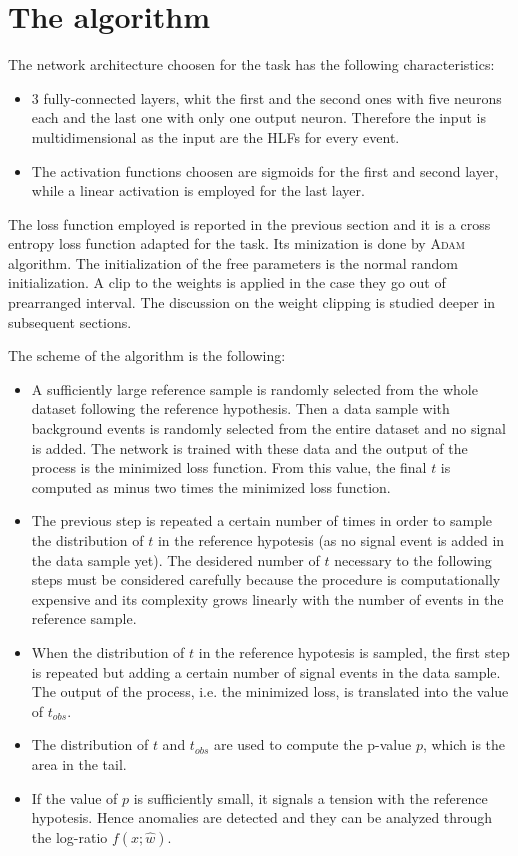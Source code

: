 \section{The algorithm}
The network architecture choosen for the task has the following characteristics:
\begin{itemize}
	\item 3 fully-connected layers, whit the first and the second ones with five neurons each and the last one with only one output neuron. Therefore the input is multidimensional as the input are the HLFs for every event.
	\item The activation functions choosen are sigmoids for the first and second layer, while a linear activation is employed for the last layer.
\end{itemize}

The loss function employed is reported in the previous section and it is a cross entropy loss function adapted for the task. Its minization is done by \textsc{Adam} algorithm. The initialization of the free parameters is the normal random initialization. A clip to the weights is applied in the case they go out of prearranged interval. The discussion on the weight clipping is studied deeper in subsequent sections.

The scheme of the algorithm is the following:
\begin{itemize}
	\item A sufficiently large reference sample is randomly selected from the whole dataset following the reference hypothesis. Then a data sample with background events is randomly selected from the entire dataset and no signal is added. The network is trained with these data and the output of the process is the minimized loss function. From this value, the final $t$ is computed as minus two times the minimized loss function.
	\item The previous step is repeated a certain number of times in order to sample the distribution of $t$ in the reference hypotesis (as no signal event is added in the data sample yet). The desidered number of $t$ necessary to the following steps must be considered carefully because the procedure is computationally expensive and its complexity grows linearly with the number of events in the reference sample.
	\item When the distribution of $t$ in the reference hypotesis is sampled, the first step is repeated but adding a certain number of signal events in the data sample. The output of the process, i.e. the minimized loss, is translated into the value of $t_{obs}$.
	\item The distribution of $t$ and $t_{obs}$ are used to compute the p-value $p$, which is the area in the tail.
	\item If the value of $p$ is sufficiently small, it signals a tension with the reference hypotesis. Hence anomalies are detected and they can be analyzed through the log-ratio $f(x;\hat{w})$.
\end{itemize}





